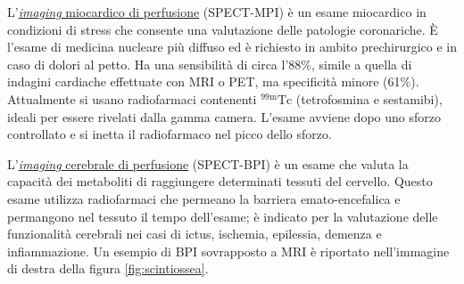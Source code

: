 \documentclass{report}
\newcommand{\figref}[1]{figura \ref{#1}}
\numberwithin{equation}{section}
\numberwithin{figure}{section}
\begin{document}
L'\underline{\textit{imaging} miocardico di perfusione} (SPECT-MPI) è un esame miocardico in condizioni di stress che consente una valutazione delle patologie coronariche. È l’esame di medicina nucleare più diffuso ed è richiesto in ambito prechirurgico e in caso di dolori al petto. Ha una sensibilità di circa l'88\%, simile a quella di indagini cardiache effettuate con MRI o PET, ma specificità minore (61\%). Attualmente si usano radiofarmaci contenenti $\mathrm{^{99m}Tc}$ (tetrofosmina e sestamibi), ideali per essere rivelati dalla gamma camera. L’esame avviene dopo uno sforzo controllato e si inetta il radiofarmaco nel picco dello sforzo.

L'\underline{\textit{imaging} cerebrale di perfusione} (SPECT-BPI) è un esame che valuta la capacità dei metaboliti di raggiungere determinati tessuti del cervello. Questo esame utilizza radiofarmaci che permeano la barriera emato-encefalica e permangono nel tessuto il tempo dell'esame; è indicato per la valutazione delle funzionalità cerebrali nei casi di ictus, ischemia, epilessia, demenza e infiammazione. Un esempio di BPI sovrapposto a MRI è riportato nell'immagine di destra della \figref{fig:scintiossea}.
\end{document}
